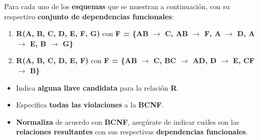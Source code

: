 Para cada uno de los \textbf{esquemas} que se muestran a continuación, con su respectivo \textbf{conjunto de dependencias funcionales}:

\begin{enumerate}[label=\alph*.]
    \item \textbf{R(A, B, C, D, E, F, G)} con \textbf{F = \{AB $\rightarrow$ C, AB $\rightarrow$ F, A $\rightarrow$ D, A $\rightarrow$ E, B $\rightarrow$ G\}}
    \item \textbf{R(A, B, C, D, E, F)} con \textbf{F = \{AB $\rightarrow$ C, BC $\rightarrow$ AD, D $\rightarrow$ E, CF $\rightarrow$ B\}}
\end{enumerate}

\begin{itemize}
    \item Indica \textbf{alguna llave candidata} para la relación \textbf{R}.
    \item Especifica \textbf{todas las violaciones} a la \textbf{BCNF}.
    \item \textbf{Normaliza} de acuerdo con \textbf{BCNF}, asegúrate de indicar cuáles son las \textbf{relaciones resultantes} con sus respectivas \textbf{dependencias funcionales}. 
\end{itemize}
